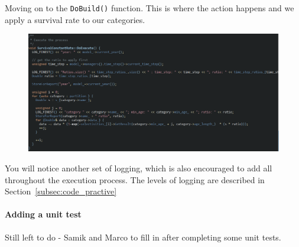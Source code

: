 Moving on to the \texttt{DoBuild()} function. This is where the action happens and we apply a survival rate to our categories.
\clearpage
\begin{figure}[!ht]
	\centering
	\includegraphics[scale=0.65]{Figures/execute.png}
	\caption{}\label{fig:execute}
\end{figure}

You will notice another set of logging, which is also encouraged to add all throughout the execution process. The levels of logging are described in Section~\ref{subsec:code_practive}

\paragraph*{Adding a unit test}

Still left to do - Samik and Marco to fill in after completing some unit tests.

